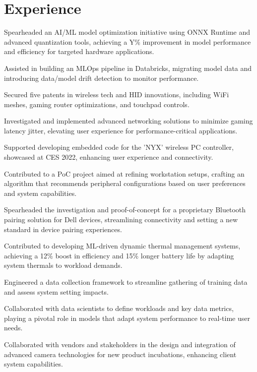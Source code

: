 \documentclass[10pt]{resume-openfont}
\begin{document}
\begin{minipage}[t]{1\textwidth}
\section{Experience}
\titlerule
\vspace{1mm} %

\begin{tightemize}
\item Spearheaded an AI/ML model optimization initiative using ONNX Runtime and advanced quantization tools, achieving a Y\% improvement in model performance and efficiency for targeted hardware applications.
\item Assisted in building an MLOps pipeline in Databricks, migrating model data and introducing data/model drift detection to monitor performance.
\item Secured five patents in wireless tech and HID innovations, including WiFi meshes, gaming router optimizations, and touchpad controls.
\item Investigated and implemented advanced networking solutions to minimize gaming latency jitter, elevating user experience for performance-critical applications.
\item Supported developing embedded code for the 'NYX' wireless PC controller, showcased at CES 2022, enhancing user experience and connectivity.
\item Contributed to a PoC project aimed at refining workstation setups, crafting an algorithm that recommends peripheral configurations based on user preferences and system capabilities.
\end{tightemize}
\sectionsep

\begin{tightemize}
\item Spearheaded the investigation and proof-of-concept for a proprietary Bluetooth pairing solution for Dell devices, streamlining connectivity and setting a new standard in device pairing experiences.
\item Contributed to developing ML-driven dynamic thermal management systems, achieving a 12\% boost in efficiency and 15\% longer battery life by adapting system thermals to workload demands.
\item Engineered a data collection framework to streamline gathering of training data and assess system setting impacts.
\item Collaborated with data scientists to define workloads and key data metrics, playing a pivotal role in models that adapt system performance to real-time user needs.
\item Collaborated with vendors and stakeholders in the design and integration of advanced camera technologies for new product incubations, enhancing client system capabilities.
\end{tightemize}
\sectionsep


\end{minipage}
\end{document}
